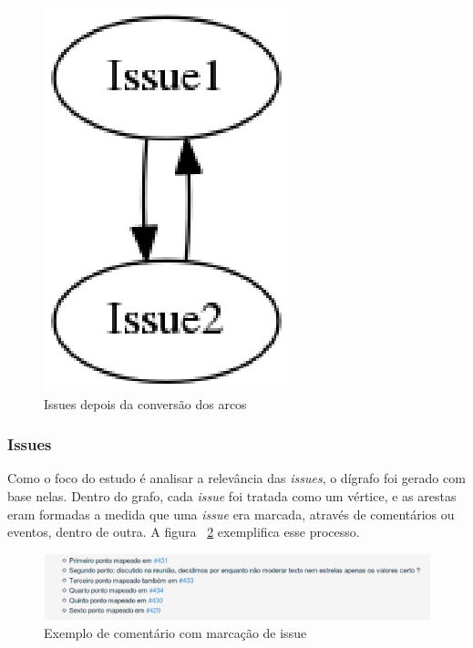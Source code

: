 \begin{figure}[h]
    \centering
        \includegraphics[keepaspectratio=true,scale=0.5]{figuras/directed.eps}
    \caption{Issues depois da conversão dos arcos}
    \label{fig:directed}
\end{figure}

\newpage
\subsubsection{Issues}
\label{est:ran:iss}

Como o foco do estudo é analisar a relevância das \textit{issues}, o dígrafo 
foi gerado com base nelas. Dentro do grafo, cada \textit{issue} foi tratada
como um vértice, e as arestas eram formadas a medida que uma \textit{issue}
era marcada, através de comentários ou eventos, dentro de outra. A figura
~\ref{fig:issue-comment} exemplifica esse processo.

\begin{figure}[h]
    \centering
        \includegraphics[keepaspectratio=true,scale=0.5]{figuras/issue-comment.eps}
    \caption{Exemplo de comentário com marcação de issue}
    \label{fig:issue-comment}
\end{figure}


